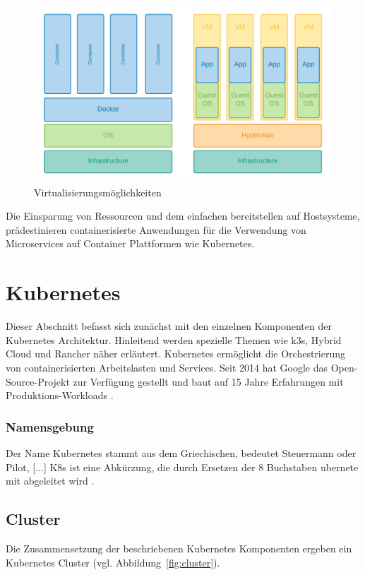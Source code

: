 \begin{figure}
    \centering
    \includegraphics[width=1.0\columnwidth]{images/Container-VM.png}
    \caption{Virtualisierungsmöglichkeiten \protect}
    \label{fig:containervm}
\end{figure}

Die Einsparung von Ressourcen und dem einfachen bereitstellen auf Hostsysteme,
prädestinieren containerisierte Anwendungen für die Verwendung von Microservices
auf Container Plattformen wie Kubernetes.


\section{Kubernetes}

Dieser Abschnitt befasst sich zunächst mit den einzelnen Komponenten der Kubernetes Architektur.
Hinleitend werden spezielle Themen wie k3s, Hybrid Cloud und Rancher näher erläutert.
Kubernetes ermöglicht die Orchestrierung von containerisierten Arbeitslasten
und Services. Seit 2014 hat Google das Open-Source-Projekt zur Verfügung
gestellt und baut auf 15 Jahre Erfahrungen mit Produktions-Workloads \cite{kubernetes}.

\subsubsection{Namensgebung}
\glqq Der Name Kubernetes stammt aus dem Griechischen, bedeutet Steuermann oder Pilot, [...]
K8s ist eine Abkürzung, die durch Ersetzen der 8 Buchstaben \glqq ubernete\grqq{} mit \grqq{} abgeleitet wird\grqq{} \cite{kubernetes}.

\subsection{Cluster}
Die Zusammensetzung der beschriebenen Kubernetes Komponenten ergeben ein Kubernetes Cluster (vgl. Abbildung~\ref{fig:cluster}).

